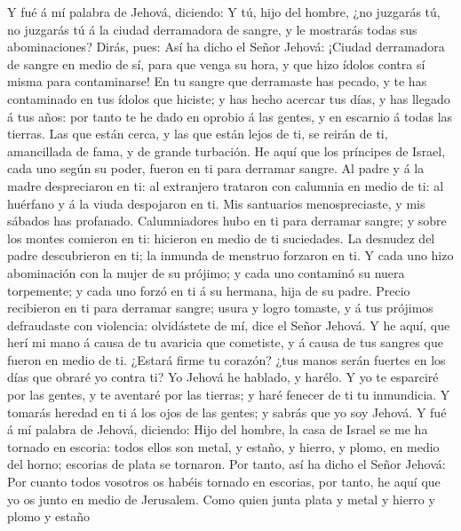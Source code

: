  Y fué á mí palabra de Jehová, diciendo:  Y
tú, hijo del hombre, ¿no juzgarás tú, no juzgarás tú á la ciudad
derramadora de sangre, y le mostrarás todas sus abominaciones?
 Dirás, pues: Así ha dicho el Señor Jehová: ¡Ciudad
derramadora de sangre en medio de sí, para que venga su hora, y que hizo
ídolos contra sí misma para contaminarse!  En tu sangre
que derramaste has pecado, y te has contaminado en tus ídolos que
hiciste; y has hecho acercar tus días, y has llegado á tus años: por
tanto te he dado en oprobio á las gentes, y en escarnio á todas las
tierras.  Las que están cerca, y las que están lejos de
ti, se reirán de ti, amancillada de fama, y de grande turbación.
 He aquí que los príncipes de Israel, cada uno según su
poder, fueron en ti para derramar sangre.  Al padre y á la
madre despreciaron en ti: al extranjero trataron con calumnia en medio
de ti: al huérfano y á la viuda despojaron en ti.  Mis
santuarios menospreciaste, y mis sábados has profanado. 
Calumniadores hubo en ti para derramar sangre; y sobre los montes
comieron en ti: hicieron en medio de ti suciedades.  La
desnudez del padre descubrieron en ti; la inmunda de menstruo forzaron
en ti.  Y cada uno hizo abominación con la mujer de su
prójimo; y cada uno contaminó su nuera torpemente; y cada uno forzó en
ti á su hermana, hija de su padre.  Precio recibieron en
ti para derramar sangre; usura y logro tomaste, y á tus prójimos
defraudaste con violencia: olvidástete de mí, dice el Señor Jehová.
 Y he aquí, que herí mi mano á causa de tu avaricia que
cometiste, y á causa de tus sangres que fueron en medio de ti.
 ¿Estará firme tu corazón? ¿tus manos serán fuertes en
los días que obraré yo contra ti? Yo Jehová he hablado, y harélo.
 Y yo te esparciré por las gentes, y te aventaré por las
tierras; y haré fenecer de ti tu inmundicia.  Y tomarás
heredad en ti á los ojos de las gentes; y sabrás que yo soy Jehová.
 Y fué á mí palabra de Jehová, diciendo: 
Hijo del hombre, la casa de Israel se me ha tornado en escoria: todos
ellos son metal, y estaño, y hierro, y plomo, en medio del horno;
escorias de plata se tornaron.  Por tanto, así ha dicho
el Señor Jehová: Por cuanto todos vosotros os habéis tornado en
escorias, por tanto, he aquí que yo os junto en medio de Jerusalem.
 Como quien junta plata y metal y hierro y plomo y estaño
